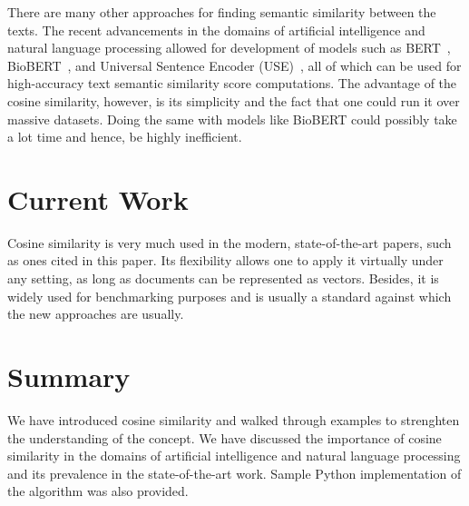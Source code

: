 \documentclass[11pt]{article}
\begin{document}
\medskip

There are many other approaches for finding semantic similarity between the
texts. The recent advancements in the domains of artificial intelligence and
natural language processing allowed for development of models such as
BERT~\cite{turc2019}, BioBERT~\cite{btz682}, and Universal Sentence Encoder
(USE)~\cite{use}, all of which can be used for high-accuracy text semantic
similarity score computations. The advantage of the cosine similarity, however,
is its simplicity and the fact that one could run it over massive datasets.
Doing the same with models like BioBERT could possibly take a lot time and
hence, be highly inefficient.


\section{Current Work}

Cosine similarity is very much used in the modern, state-of-the-art papers,
such as ones cited in this paper. Its flexibility allows one to apply it
virtually under any setting, as long as documents can be represented as
vectors. Besides, it is widely used for benchmarking purposes and is usually a
standard against which the new approaches are usually.


\section{Summary}

We have introduced cosine similarity and walked through examples to strenghten
the understanding of the concept. We have discussed the importance of cosine
similarity in the domains of artificial intelligence and natural language
processing and its prevalence in the state-of-the-art work. Sample Python
implementation of the algorithm was also provided.


\printbibliography[heading=bibintoc]

\end{document}
